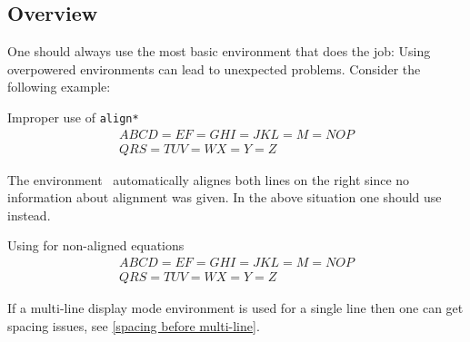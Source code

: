 \subsection{Overview}

One should always use the most basic environment that does the job:
Using overpowered environments can lead to unexpected problems.
Consider the following example:
\begin{showlatex}{Improper use of \texttt{align*}}
\begin{align*}
  ABCD = EF = GHI = JKL = M = NOP
  \\
  QRS = TUV = WX = Y = Z
\end{align*}
\end{showlatex}
The environment~ automatically alignes both lines on the right since no information about alignment was given.
In the above situation one should use  instead.
\begin{showlatex}{Using  for non-aligned equations}
\begin{gather*}
  ABCD = EF = GHI = JKL = M = NOP
  \\
  QRS = TUV = WX = Y = Z
\end{gather*}
\end{showlatex}
If a multi-line display mode environment is used for a single line then one can get spacing issues, see \cref{spacing before multi-line}.

